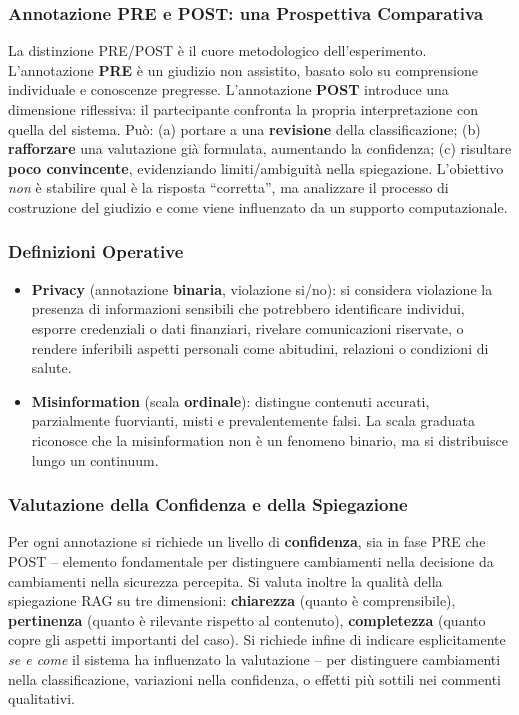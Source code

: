 \documentclass[12pt,a4paper]{article}
\begin{document}
\subsubsection{Annotazione PRE e POST: una Prospettiva Comparativa}

\begin{defbox}
La distinzione PRE/POST \`e il cuore metodologico dell'esperimento. L'annotazione \textbf{PRE} \`e un giudizio non assistito, basato solo su comprensione individuale e conoscenze pregresse. L'annotazione \textbf{POST} introduce una dimensione riflessiva: il partecipante confronta la propria interpretazione con quella del sistema. Pu\`o: (a) portare a una \textbf{revisione} della classificazione; (b) \textbf{rafforzare} una valutazione gi\`a formulata, aumentando la confidenza; (c) risultare \textbf{poco convincente}, evidenziando limiti/ambiguit\`a nella spiegazione. L'obiettivo \emph{non} \`e stabilire qual \`e la risposta ``corretta'', ma analizzare il processo di costruzione del giudizio e come viene influenzato da un supporto computazionale.
\end{defbox}

\subsubsection{Definizioni Operative}

\begin{itemize}
  \item \textbf{Privacy} (annotazione \textbf{binaria}, violazione si/no): si considera violazione la presenza di informazioni sensibili che potrebbero identificare individui, esporre credenziali o dati finanziari, rivelare comunicazioni riservate, o rendere inferibili aspetti personali come abitudini, relazioni o condizioni di salute.
  \item \textbf{Misinformation} (scala \textbf{ordinale}): distingue contenuti accurati, parzialmente fuorvianti, misti e prevalentemente falsi. La scala graduata riconosce che la misinformation non \`e un fenomeno binario, ma si distribuisce lungo un continuum.
\end{itemize}

\subsubsection{Valutazione della Confidenza e della Spiegazione}

Per ogni annotazione si richiede un livello di \textbf{confidenza}, sia in fase PRE che POST -- elemento fondamentale per distinguere cambiamenti nella decisione da cambiamenti nella sicurezza percepita. Si valuta inoltre la qualit\`a della spiegazione RAG su tre dimensioni: \textbf{chiarezza} (quanto \`e comprensibile), \textbf{pertinenza} (quanto \`e rilevante rispetto al contenuto), \textbf{completezza} (quanto copre gli aspetti importanti del caso). Si richiede infine di indicare esplicitamente \emph{se e come} il sistema ha influenzato la valutazione -- per distinguere cambiamenti nella classificazione, variazioni nella confidenza, o effetti pi\`u sottili nei commenti qualitativi.
\end{document}
